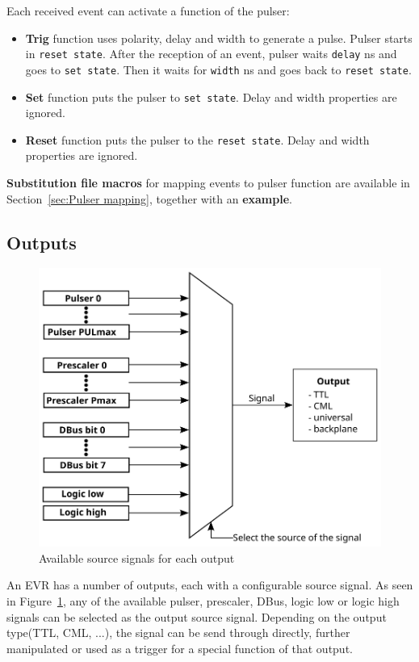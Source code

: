 \documentclass[12pt,a4paper]{article}
\begin{document}
Each received event can activate a function of the pulser:
\begin{itemize}
	\item \textbf{Trig} function uses polarity, delay and width to generate a pulse. Pulser starts in \texttt{reset state}. After the reception of an event, pulser waits \texttt{delay} ns and goes to \texttt{set state}. Then it waits for \texttt{width} ns and goes back to \texttt{reset state}.
	\item \textbf{Set} function puts the pulser to \texttt{set state}. Delay and width properties are ignored.
	\item \textbf{Reset} function puts the pulser to the \texttt{reset state}. Delay and width properties are ignored.
\end{itemize}

\textbf{Substitution file macros} for mapping events to pulser function are available in Section~\ref{sec:Pulser mapping}, together with an \textbf{example}.

\subsection{Outputs}\label{sec:Outputs}
\begin{figure}[H]
	\centering
	\includegraphics[]{./img/output}
	\caption{Available source signals for each output}
	\label{fig:output}
\end{figure}

An EVR has a number of outputs, each with a configurable source signal. As seen in Figure~\ref{fig:output}, any of the available pulser, prescaler, DBus, logic low or logic high signals can be selected as the output source signal. Depending on the output type(TTL, CML, ...), the signal can be send through directly, further manipulated or used as a trigger for a special function of that output.
\end{document}
